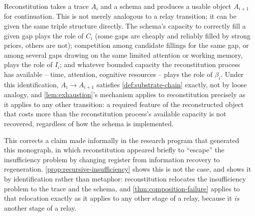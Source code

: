 \begin{proofsketch}
Reconstitution takes a trace $A_i$ and a schema and produces a usable
object $A_{i+1}$ for continuation. This is not merely analogous to a
relay transition; it can be given the same triple structure directly.
The schema's capacity to correctly fill a given gap plays the role of
$C_i$ (some gaps are cheaply and reliably filled by strong priors, others
are not); competition among candidate fillings for the same gap, or
among several gaps drawing on the same limited attention or working
memory, plays the role of $I_i$; and whatever bounded capacity the
reconstitution process has available -- time, attention, cognitive
resources -- plays the role of $\beta_i$. Under this identification,
$A_i \to A_{i+1}$ satisfies \cref{def:substrate-chain} exactly, not by
loose analogy, and \cref{lem:exhaustion}'s mechanism applies to
reconstitution precisely as it applies to any other transition: a
required feature of the reconstructed object that costs more than the
reconstitution process's available capacity is not recovered, regardless
of how the schema is implemented.
\end{proofsketch}

This corrects a claim made informally in the research program that
generated this monograph, in which reconstitution appeared briefly to
``escape'' the insufficiency problem by changing register from
information recovery to regeneration. \cref{prop:recursive-insufficiency}
shows this is not the case, and shows it by identification rather than
metaphor: reconstitution relocates the insufficiency problem to the trace
and the schema, and \cref{thm:composition-failure} applies to that
relocation exactly as it applies to any other stage of a relay, because
it \emph{is} another stage of a relay.
